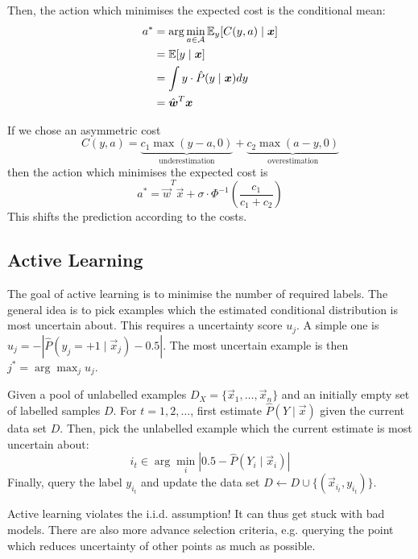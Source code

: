 Then, the action which minimises the
expected cost is the conditional mean:
\begin{align*}
a^* &=
\arg\min_{a \in \mathcal{A}}{
	\mathbb{E}_y[C(y, a) \mid \boldsymbol{x}]
} \\
&= \mathbb{E}[y \mid \boldsymbol{x}] \\
&= \int{y \cdot \hat{P}(y \mid \boldsymbol{x}) dy} \\
&= \hat{\boldsymbol{w}}^T \boldsymbol{x}
\end{align*}

If we chose an asymmetric cost
\begin{equation*}
C(y, a) =
\underbrace{c_1 \max{(y - a, 0)}}_\text{underestimation}
+
\underbrace{c_2 \max{(a - y, 0)}}_\text{overestimation}
\end{equation*}
then the action which minimises the
expected cost is
\begin{equation*}
a^* = \hat{\vec{w}}^T \vec{x}
+ \sigma \cdot \Phi^{-1}\left(
\frac{c_1}{c_1 + c_2}
\right)
\end{equation*}
This shifts the prediction according
to the costs.


\subsection{Active Learning}
The goal of active learning is to minimise
the number of required labels.
The general idea is to pick examples
which the estimated conditional distribution
is most uncertain about.
This requires a uncertainty score $u_j$.
A simple one is
$u_j = -|\hat{P}(y_j = +1 \mid \vec{x}_j) - 0.5|$.
The most uncertain example is then
$j^* = \arg\max_j{u_j}$.

Given a pool of unlabelled examples
$D_X = \{\vec{x}_1, \dotsc, \vec{x}_n\}$
and an initially empty set of labelled
samples $D$.
For $t = 1, 2, \dotsc$, first
estimate $\hat{P}(Y \mid \vec{x})$
given the current data set $D$.
Then, pick the unlabelled example which
the current estimate is most uncertain
about:
\begin{equation*}
i_t \in \arg\min_i{
	|0.5 - \hat{P}(Y_i \mid \vec{x}_i)|
}
\end{equation*}
Finally, query the label $y_{i_t}$
and update the data set
$D \gets D \cup \{(\vec{x}_{i_t}, y_{i_t})\}$.

Active learning violates the i.i.d.
assumption!
It can thus get stuck with bad models.
There are also more advance selection
criteria,
e.g. querying the point which reduces
uncertainty of other points as much
as possible.
